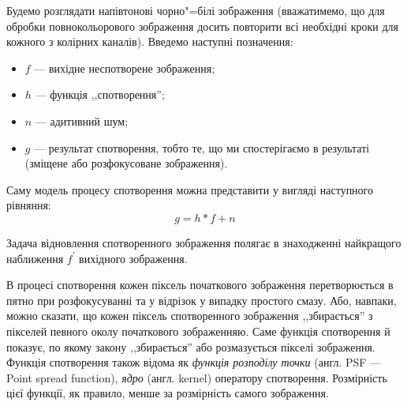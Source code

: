 \documentclass[simple,14pt,utf8,ukrainian]{eskdtext}
\begin{document}
Будемо розглядати напівтонові чорно"=білі зображення (вважатимемо, що для
обробки повнокольорового зображення досить повторити всі необхідні кроки для
кожного з колірних каналів).
Введемо наступні позначення:
\begin{itemize}
  \item $f$ --- вихідне неспотворене зображення;
  \item $h$ --- функція ,,спотворення'';
  \item $n$ --- адитивний шум;
  \item $g$ --- результат спотворення, тобто те, що ми спостерігаємо в
    результаті (зміщене або розфокусоване зображення).
\end{itemize}

Саму модель процесу спотворення можна представити у вигляді наступного
рівняння:
\begin{equation}
  g = h \ast f + n
  \label{eq:model}
\end{equation}

Задача відновлення спотворенного зображення полягає в знаходженні найкращого
наближення $f^\prime$ вихідного зображення.

В процесі спотворення кожен піксель початкового зображення перетворюється в
пятно при розфокусуванні та у відрізок у випадку простого смазу.
Або, навпаки, можно сказати, що кожен піксель спотворенного зображення
,,збирається'' з пікселей певного околу початкового зображенняю.
Саме функція спотворення й показує, по якому закону ,,збирається'' або
розмазується пікселі зображення.
Функція спотворення також відома як \emph{функція розподілу точки} (англ. PSF
--- Point spread function), \emph{ядро} (англ. kernel) оператору спотворення.
Розмірність цієї функції, як правило, менше за розмірність самого зображення.
\end{document}
